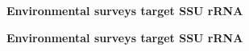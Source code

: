 \documentclass[landscape]{slides}
\begin{document}
\begin{slide}
\begin{center}
\large
\textbf{Environmental surveys target SSU rRNA}
\end{center}

\vfill
\end{slide}
\begin{slide}
\begin{center}
\large
\textbf{Environmental surveys target SSU rRNA}
\end{center}
\vfill
\end{slide}
\end{document}
